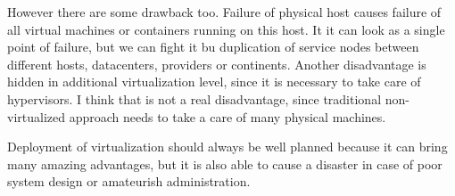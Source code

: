 However there are some drawback too. Failure of physical host causes failure of all virtual machines or containers running on this host. It it can look as a single point of failure, but we can fight it bu duplication of service nodes between different hosts, datacenters, providers or continents.
Another disadvantage is hidden in additional virtualization level, since it is necessary to take care of hypervisors. I think that is not a real disadvantage, since traditional non-virtualized approach needs to take a care of many physical machines.

Deployment of virtualization should always be well planned because it can bring many amazing advantages, but it is also able to cause a disaster in case of poor system design or amateurish administration.
